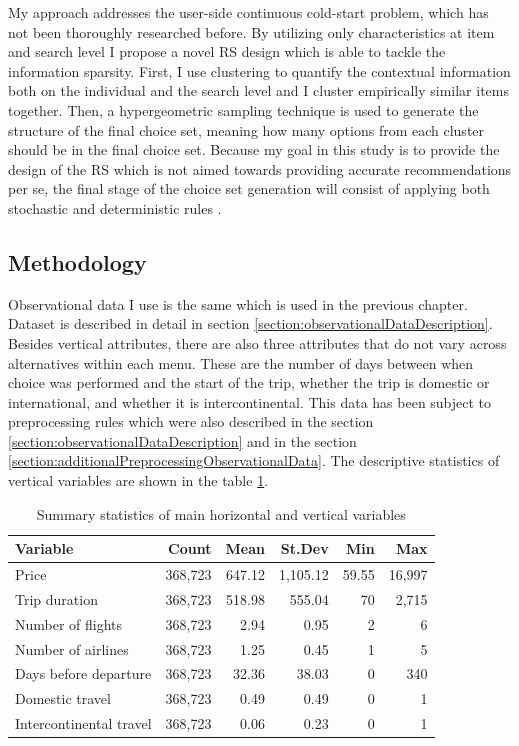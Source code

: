 \documentclass[a4paper,12pt]{article}
\begin{document}
My approach addresses the user-side continuous cold-start problem, which has not been thoroughly researched before. By utilizing only characteristics at item and search level I propose a novel RS design which is able to tackle the information sparsity. First, I use clustering \citep{rokach2005clustering} to quantify the contextual information both on the individual and the search level and I cluster empirically similar items together. Then, a hypergeometric sampling technique is used to generate the structure of the final choice set, meaning how many options from each cluster should be in the final choice set. Because my goal in this study is to provide the design of the RS which is not aimed towards providing accurate recommendations per se, the final stage of the choice set generation will consist of applying both stochastic \citep{mcfadden1973conditional, urban1984testing} and deterministic rules \citep{hauser2014consideration, lee2004effect, coombs1951mathematical}.

\subsection{Methodology}

Observational data I use is the same which is used in the previous chapter. Dataset is described in detail in section \ref{section:observationalDataDescription}. Besides vertical attributes, there are also  three attributes that do not vary across alternatives within each menu. These are the number of days between when choice was performed and the start of the trip, whether the trip is domestic or international, and whether it is intercontinental. This data has been subject to preprocessing rules which were also described in the section \ref{section:observationalDataDescription} and in the section \ref{section:additionalPreprocessingObservationalData}. The descriptive statistics of vertical variables are shown in the table \ref{tab:descriptiveObservationalShort}.

\begin{table}[ht]
    \centering
    \begin{tabular}{lrrrrr}
    \hline
    Variable & Count & Mean & St.Dev & Min & Max \\
    \hline
    Price & 368,723 & 647.12 & 1,105.12 & 59.55 & 16,997 \\
    Trip duration & 368,723 & 518.98 & 555.04 & 70 & 2,715 \\
    Number of flights & 368,723 & 2.94 & 0.95 & 2 & 6 \\
    Number of airlines & 368,723 & 1.25 & 0.45 & 1 & 5 \\
    Days before departure & 368,723 & 32.36 & 38.03 & 0 & 340\\
    Domestic travel & 368,723 & 0.49 & 0.49 & 0 & 1\\
    Intercontinental travel & 368,723 & 0.06 & 0.23 & 0 & 1\\\hline
    \end{tabular}
    \caption{Summary statistics of main horizontal and vertical variables}
    \label{tab:descriptiveObservationalShort}
\end{table}
\end{document}
